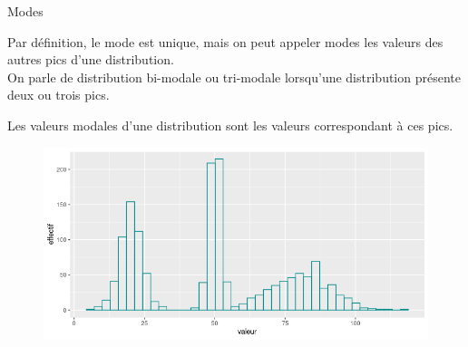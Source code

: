 \documentclass{beamer}
\begin{document}
\begin{frame}{Modes}

Par définition, le mode est unique, mais on peut appeler modes les valeurs des autres pics d’une distribution.\\

 On parle de distribution \alert{bi-modale} ou \alert{tri-modale} lorsqu’une distribution présente deux ou trois pics. 

 Les \alert{valeurs modales} d’une distribution sont les valeurs correspondant à ces pics. 



\begin{figure}
  \centering
     \includegraphics[width=.7\linewidth]{img/trimodale.png}
\end{figure}

\end{frame}
\end{document}
